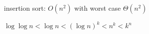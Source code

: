 \documentclass[10pt, landscape]{article}
\begin{document}
\begin{multicols*}{4}
  insertion sort: $O(n^2)$ with worst case $\Theta(n^2)$

  \begin{fixedbox}[0.8]
    $\log\log n < \log n < (\log n)^k < n^k < k^n$
  \end{fixedbox}























\end{multicols*}
\end{document}
